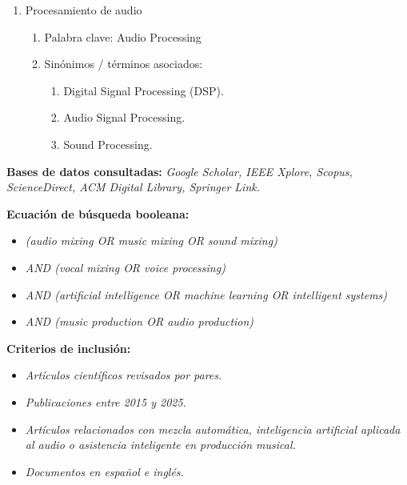 \documentclass[12pt]{article}
\begin{document}
\begin{enumerate}
\begin{enumerate}
        \item Sinónimos / términos asociados:
        \begin{enumerate}[label=\roman*)]
            \item Neural Networks.
            \item DNN (Deep Neural Networks).
            \item Convolutional Neural Networks (CNN).
            \item Generative Models.
        \end{enumerate}
    \end{enumerate}
    \item Procesamiento de audio
    \begin{enumerate}
        \item Palabra clave: Audio Processing
        \item Sinónimos / términos asociados:
        \begin{enumerate}[label=\roman*)]
            \item Digital Signal Processing (DSP).
            \item Audio Signal Processing.
            \item Sound Processing.
        \end{enumerate}
    \end{enumerate}
\end{enumerate}

\textbf{Bases de datos consultadas:} \textit{Google Scholar, IEEE Xplore, Scopus, ScienceDirect, ACM Digital Library, Springer Link.}

\textbf{Ecuación de búsqueda booleana:}

\begin{itemize}
    \item \textit{(audio mixing OR music mixing OR sound mixing)}
    \item \textit{AND (vocal mixing OR voice processing)}
    \item \textit{AND (artificial intelligence OR machine learning OR intelligent systems)}
    \item \textit{AND (music production OR audio production)}
\end{itemize}

\textbf{Criterios de inclusión:}

\begin{itemize}
    \item \textit{Artículos científicos revisados por pares.}
    \item \textit{Publicaciones entre 2015 y 2025.}
    \item \textit{Artículos relacionados con mezcla automática, inteligencia artificial aplicada al audio o asistencia inteligente en producción musical.}
    \item \textit{Documentos en español e inglés.}
\end{itemize}
\end{document}
